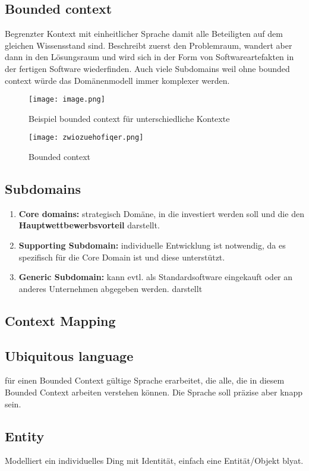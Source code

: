 \documentclass{book}
\begin{document}
    \subsection{ \textbf{Bounded context}}
    Begrenzter Kontext mit einheitlicher Sprache damit alle Beteiligten auf dem gleichen Wissensstand sind. Beschreibt zuerst den Problemraum, wandert aber dann in den Lösungsraum und wird sich in der Form von Softwareartefakten in der fertigen Software wiederfinden.
    Auch viele Subdomains weil ohne bounded context würde das Domänenmodell immer komplexer werden.
    \begin{figure} [h]
        \centering
        \texttt{[image: image.png]}
        \caption{Beispiel bounded context für unterschiedliche Kontexte}
        \label{fig:enter-label}
    \end{figure}
    \begin{figure} [h]
        \centering
        \texttt{[image: zwiozuehofiqer.png]}
        \caption{Bounded context}
        \label{fig:enter-label}
    \end{figure}
    \subsection{Subdomains}
    \begin{enumerate}
        \item \textbf{Core domains: } strategisch Domäne, in die investiert werden soll und die den \textbf{Hauptwettbewerbsvorteil} darstellt.
        \item \textbf{Supporting Subdomain:} individuelle Entwicklung ist notwendig, da es spezifisch für die Core Domain ist und
        diese unterstützt.
        \item \textbf{Generic Subdomain: } kann evtl. als Standardsoftware eingekauft oder an anderes Unternehmen abgegeben
        werden.
        darstellt
    \end{enumerate}
    \subsection{Context Mapping}
    \subsection{Ubiquitous language}
    für einen Bounded Context gültige Sprache erarbeitet, die alle, die in diesem Bounded Context arbeiten
    verstehen können. Die Sprache soll präzise aber knapp sein.
    \subsection{Entity}
    Modelliert ein individuelles Ding mit Identität, einfach eine Entität/Objekt blyat.
\end{document}
